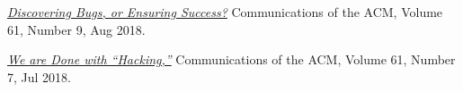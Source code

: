 \documentclass{yb}
\begin{document}
    \begin{samepage}
        \emph{\href{https://www.yegor256.com/pdf/2018/discovering-bugs.pdf}{Discovering Bugs, or Ensuring Success?}}\newline
        Communications of the ACM, Volume 61, Number 9, Aug 2018.
    \end{samepage}

    \begin{samepage}
        \emph{\href{https://www.yegor256.com/pdf/2018/we-are-done-with-hacking.pdf}{We are Done with ``Hacking,''}}\newline
        Communications of the ACM, Volume 61, Number 7, Jul 2018.
    \end{samepage}






\end{document}
